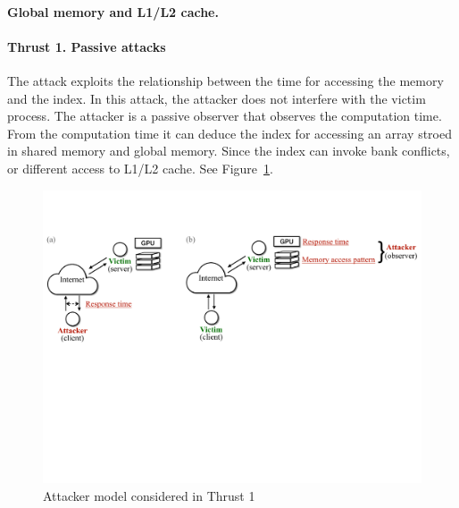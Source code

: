 \paragraph{Global memory and L1/L2 cache.}


\paragraph{Thrust 1. Passive attacks}
The attack exploits the relationship between
the time for accessing the memory and the index.
%
In this attack, the attacker does not interfere with the victim process.
%
The attacker is a passive observer that observes the computation time. 
%
From the computation time it can deduce the index for accessing an array stroed in shared memory and global memory.
%
Since the index can invoke bank conflicts, or different access to L1/L2 cache. 
%
See Figure~\ref{fig:th1-attack}.
\begin{figure}[h]
    \includegraphics[clip,trim=0 10cm 0 2cm,width=0.72\pdfpagewidth]{figs/thrust1-fig.pdf}
    \caption{Attacker model considered in Thrust 1 }
    \label{fig:th1-attack}
    \end{figure}

